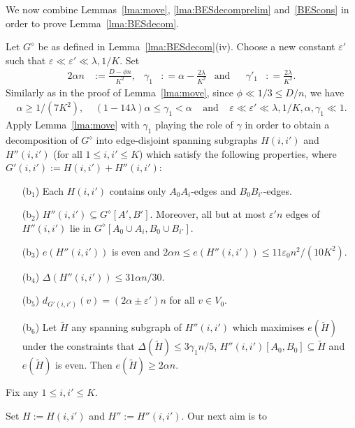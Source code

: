\documentclass{memo-l}
\def\COMMENT#1{}
\def\eps{\varepsilon}
\def\epszero{\eps_0}
\numberwithin{section}{chapter}
\numberwithin{equation}{section}
\numberwithin{firstthm}{section}
\numberwithin{figure}{section}
\begin{document}
{We now combine Lemmas~\ref{lma:move}, \ref{lma:BESdecomprelim} and~\ref{BEScons} in order
to prove Lemma~\ref{lma:BESdecom}.

\removelastskip{}\medskip{}
Let $G^{\diamond}$ be as defined in Lemma~\ref{lma:BESdecom}(iv).
Choose a new constant $\eps'$ such that $\eps \ll \eps' \ll \lambda, 1/K$.
Set 
\begin{align} \label{alpha'}
2 \alpha n & := \frac{ D - \phi n }{K^2}, 
& \gamma_1 & : = \alpha -  \frac{2\lambda}{K^2}
& \text{and} &
& \gamma'_1 & : = \frac{2\lambda }{K^2}.
\end{align}
Similarly as in the proof of Lemma~\ref{lma:move}, since $\phi  \ll 1/3\le D/n$, we have
\begin{align} \label{alphahier2}
	\alpha \ge 1/(7K^2), \ \ \ \ \ (1-14\lambda)\alpha\le \gamma_1 <\alpha \ \ \ \ \  \text{and} \ \ \ \ \ \eps \ll \eps'  \ll \lambda, 1/K,\alpha, \gamma_1 \ll 1.
\end{align}
Apply Lemma~\ref{lma:move} with $\gamma_1$ playing the role of $\gamma$ in order to obtain a decomposition
of $G^{\diamond}$ into edge-disjoint spanning subgraphs $H(i,i')$ and $H''(i,i')$ (for all $1\le i,i' \le K$) which satisfy the following
properties, where $G'(i,i'):=H(i,i')+H''(i,i')$:
\begin{itemize}
\item[\rm (b$_1$)] Each $H(i,i')$ contains only $A_0A_i$-edges and $B_0B_{i'}$-edges.
\item[\rm (b$_2$)] $H''(i,i')\subseteq G^{\diamond}[A',B']$. Moreover,
all but at most $\eps' n$ edges of $H''(i,i')$ lie in $G^{\diamond}[A_0 \cup A_i, B_0 \cup B_{i'}]$.
\item[\rm (b$_3$)] $e(H''(i,i'))$ is even and $ 2 \alpha n \le e(H''(i,i')) \le 11\epszero n^2/(10K^2)$.
\item[\rm (b$_4$)] $\Delta(H''(i,i')) \le 31 \alpha n/30 $.
\item[\rm (b$_5$)] $d_{G'(i,i')}(v )  =  \left( 2 \alpha \pm   \eps' \right) n $ for all $v \in V_0$.
\item[\rm (b$_6$)] Let $\widetilde{H}$ any spanning subgraph of $H''(i,i')$ which maximises $e(\widetilde{H})$
under the constraints that $\Delta(\widetilde{H}) \le 3\gamma_1 n /5$, $H''(i,i')[A_0,B_0] \subseteq \widetilde{H}$ and $e(\widetilde{H})$ is even.
Then $e(\widetilde{H}) \ge 2 \alpha n $.
\end{itemize}
Fix any $1 \le i,i' \le K$.%
\COMMENT{AL: added $1 \le$}
 Set $H := H(i,i')$ and $H'' := H''(i,i')$. Our next aim is to 
}
\end{document}
